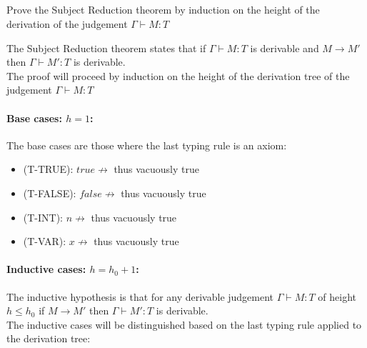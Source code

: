 \subsection{}

Prove the Subject Reduction theorem by induction on the height of the
derivation of the judgement $\Gamma \vdash M: T$

The Subject Reduction theorem states that if $\Gamma \vdash M: T$ is derivable and $M \to M'$
then $\Gamma \vdash M': T$ is derivable.\\
The proof will proceed by induction on the height of the derivation tree of the judgement
$\Gamma \vdash M: T$

\paragraph*{Base cases: $h = 1$:\\}

The base cases are those where the last typing rule is an axiom:
\begin{itemize}
	\item (T-TRUE): $true \not\to$ thus vacuously true
	\item (T-FALSE): $false \not\to$ thus vacuously true
	\item (T-INT): $n \not\to$ thus vacuously true
	\item (T-VAR): $x \not\to$ thus vacuously true
\end{itemize}

\paragraph*{Inductive cases: $h = h_0 + 1$:\\}

The inductive hypothesis is that for any derivable judgement $\Gamma \vdash M: T$ of height
$h \le h_0$ if $M \to M'$ then $\Gamma \vdash M': T$ is derivable.\\
The inductive cases will be distinguished based on the last typing rule applied to the
derivation tree:

